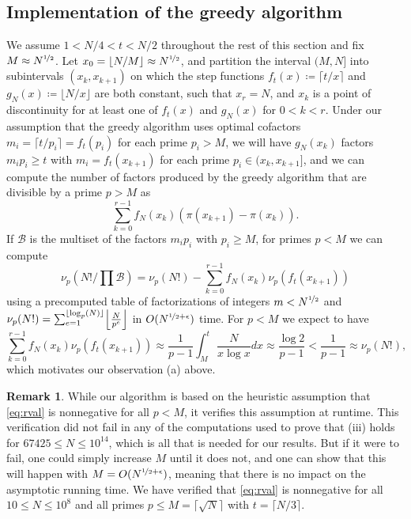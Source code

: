 \documentclass[12pt,a4paper,reqno]{amsart}
\numberwithin{equation}{section}
\theoremstyle{plain}
\theoremstyle{definition}
\newtheorem{remark}[theorem]{Remark}
\newcommand\tuple{{\mathcal B}}
\begin{document}
\subsection{Implementation of the greedy algorithm}
We assume $1< N/4< t < N/2$ throughout the rest of this section and fix $M \approx N^{\nicefrac{1}{2}}$.
Let $x_0=\lfloor N/M\rfloor \approx N^{\nicefrac{1}{2}}$, and partition the interval $(M,N]$ into subintervals $(x_k,x_{k+1})$ on which the step functions $f_t(x)\coloneqq\lceil t/x\rceil$ and $g_N(x)\coloneqq\lfloor N/x\rfloor$ are both constant, such that $x_r=N$, and $x_k$ is a point of discontinuity for at least one of $f_t(x)$ and $g_N(x)$ for $0<k<r$.  Under our assumption that the greedy algorithm uses optimal cofactors $m_i=\lceil t/p_i\rceil=f_t(p_i)$ for each prime $p_i>M$, we will have $g_N(x_k)$ factors $m_ip_i\ge t$ with $m_i=f_t(x_{k+1})$ for each prime $p_i\in (x_k,x_{k+1}]$, and we can compute the number of factors produced by the greedy algorithm that are divisible by a prime $p>M$ as
\begin{equation}\label{eq:picount}
\sum_{k=0}^{r-1} f_N(x_k)\left(\pi(x_{k+1})-\pi(x_k)\right).
\end{equation}
If $\tuple$ is the multiset of the factors $m_ip_i$ with $p_i\ge M$, for primes $p < M$ we can compute
\begin{equation}\label{eq:rval}
\nu_p\left(N!/\prod \tuple\right) = \nu_p(N!) - \sum_{k=0}^{r-1} f_N(x_k)\nu_p(f_t(x_{k+1}))
\end{equation}
using a precomputed table of factorizations of integers $m < N^{\nicefrac{1}{2}}$ and $\nu_p(N!)=\sum_{e=1}^{\lfloor \log_p(N)\rfloor} \Bigl\lfloor \frac{N}{p^e}\Bigr\rfloor$ in $O(N^{\nicefrac{1}{2}+\epsilon})$ time.  For $p < M$ we expect to have
\[
\sum_{k=0}^{r-1}f_N(x_k)\nu_p(f_t(x_{k+1})) \approx \frac{1}{p-1}\int_M^t \frac{N}{x\log x}dx \approx\frac{\log 2}{p-1} < \frac{1}{p-1} \approx \nu_p(N!),
\]
which motivates our observation (a) above.

\begin{remark} While our algorithm is based on the heuristic assumption that \eqref{eq:rval} is nonnegative for all $p<M$, it verifies this assumption at runtime. This verification did not fail in any of the computations used to prove that (iii) holds for $67425\le N\le 10^{14}$, which is all that is needed for our results.  But if it were to fail, one could simply increase $M$ until it does not, and one can show that this will happen with $M=O(N^{\nicefrac{1}{2}+\epsilon})$, meaning that there is no impact on the asymptotic running time.  We have verified that \eqref{eq:rval} is nonnegative for all $10\le N\le 10^8$ and all primes $p \le M=\lceil\sqrt{N}\rceil$ with $t=\lceil N/3\rceil$.
\end{remark}
\end{document}
